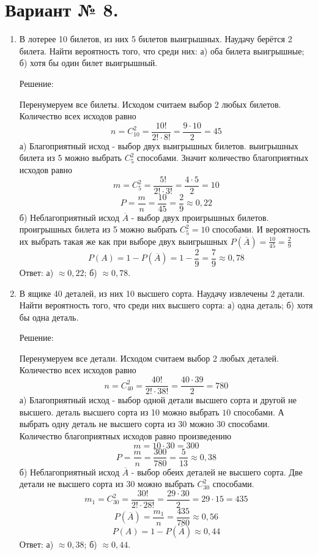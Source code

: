 \documentclass{article}
\begin{document}
\section*{Вариант № 8.}
\begin{enumerate}

\item %
В лотерее 10 билетов, из них 5 билетов выигрышных. Наудачу берётся 2 билета. Найти вероятность того, что среди них: а) оба билета выигрышные; б) хотя бы один билет выигрышный.
\begin{center}Решение:\end{center}
Перенумеруем все билеты. Исходом считаем выбор 2 любых билетов.
Количество всех исходов равно
$$n=C_{10}^{2}=\frac{10!}{2!\cdot8!}=\frac{9\cdot10}{2}=45$$
а) Благоприятный исход - выбор двух выигрышных билетов.  выигрышных билета из 5 можно выбрать $C_{5}^{2}$ способами. \newline
Значит количество благоприятных исходов равно
$$m=C_{5}^{2}=\frac{5!}{2!\cdot3!}=\frac{4\cdot5}{2}=10$$
$$P=\frac{m}{n}=\frac{10}{45}=\frac{2}{9}\approx0,22$$
б) Неблагоприятный исход $\overline{A}$ - выбор двух проигрышных билетов.   проигрышных билета из 5 можно выбрать $C_{5}^{2}=10$ способами. И вероятность их выбрать такая же как при выборе двух выигрышных $P(\overline{A})=\frac{10}{45}=\frac{2}{9}$ \newline
$$P(A)=1-P(\overline{A})=1-\frac{2}{9}=\frac{7}{9}\approx0,78$$
Ответ: а) $\approx0,22$; б) $\approx0,78$.

\item %
В ящике 40 деталей, из них 10 высшего сорта. Наудачу извлечены 2 детали. Найти вероятность того, что среди них высшего сорта: а) одна деталь; б) хотя бы одна деталь.
\begin{center}Решение:\end{center}
Перенумеруем все детали. Исходом считаем выбор 2 любых деталей.
Количество всех исходов равно
$$n=C_{40}^{2}=\frac{40!}{2!\cdot38!}=\frac{40\cdot39}{2}=780$$
а) Благоприятный исход - выбор одной детали высшего сорта и другой не высшего.  деталь высшего сорта из 10 можно выбрать $10$ способами. А выбрать одну деталь не высшего сорта из 30 можно $30$ способами. \newline
Количество благоприятных исходов равно произведению
$$m=10\cdot30=300$$
$$P=\frac{m}{n}=\frac{300}{780}=\frac{5}{13}\approx0,38$$
б) Неблагоприятный исход $\overline{A}$ - выбор обеих деталей не высшего сорта.
Две детали не высшего сорта из 30 можно выбрать $C_{30}^{2}$ способами.
$$m_1=C_{30}^{2}=\frac{30!}{2!\cdot28!}=\frac{29\cdot30}{2}=29\cdot15=435$$
$$P(\overline{A})=\frac{m_1}{n}=\frac{435}{780}\approx0,56$$
$$P(A)=1-P(\overline{A})\approx0,44$$
Ответ: а) $\approx0,38$; б) $\approx0,44$.


\end{enumerate}
\end{document}
